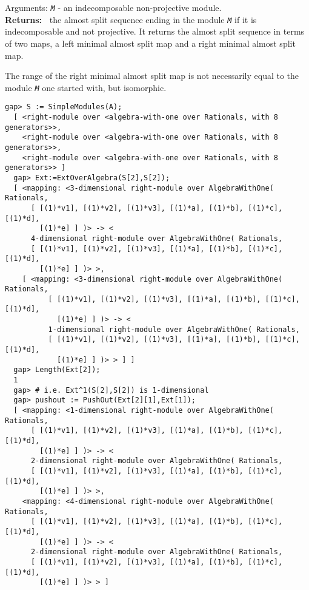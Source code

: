 \documentclass[a4paper,11pt]{report}
\begin{document}
{{{ Arguments: \mbox{\texttt{\slshape M}} - an indecomposable non-projective module.\\
 \textbf{\indent Returns:\ }
the almost split sequence ending in the module \mbox{\texttt{\slshape M}} if it is indecomposable and not projective. It returns the almost split
sequence in terms of two maps, a left minimal almost split map and a right
minimal almost split map. 



 The range of the right minimal almost split map is not necessarily equal to
the module \mbox{\texttt{\slshape M}} one started with, but isomorphic. }

 
\begin{Verbatim}[fontsize=\small,frame=single,label=Example]
  gap> S := SimpleModules(A);
  [ <right-module over <algebra-with-one over Rationals, with 8 generators>>, 
    <right-module over <algebra-with-one over Rationals, with 8 generators>>, 
    <right-module over <algebra-with-one over Rationals, with 8 generators>> ]
  gap> Ext:=ExtOverAlgebra(S[2],S[2]);
  [ <mapping: <3-dimensional right-module over AlgebraWithOne( Rationals, 
      [ [(1)*v1], [(1)*v2], [(1)*v3], [(1)*a], [(1)*b], [(1)*c], [(1)*d], 
        [(1)*e] ] )> -> <
      4-dimensional right-module over AlgebraWithOne( Rationals, 
      [ [(1)*v1], [(1)*v2], [(1)*v3], [(1)*a], [(1)*b], [(1)*c], [(1)*d], 
        [(1)*e] ] )> >, 
    [ <mapping: <3-dimensional right-module over AlgebraWithOne( Rationals, 
          [ [(1)*v1], [(1)*v2], [(1)*v3], [(1)*a], [(1)*b], [(1)*c], [(1)*d], 
            [(1)*e] ] )> -> <
          1-dimensional right-module over AlgebraWithOne( Rationals, 
          [ [(1)*v1], [(1)*v2], [(1)*v3], [(1)*a], [(1)*b], [(1)*c], [(1)*d], 
            [(1)*e] ] )> > ] ]
  gap> Length(Ext[2]);
  1
  gap> # i.e. Ext^1(S[2],S[2]) is 1-dimensional
  gap> pushout := PushOut(Ext[2][1],Ext[1]);   
  [ <mapping: <1-dimensional right-module over AlgebraWithOne( Rationals, 
      [ [(1)*v1], [(1)*v2], [(1)*v3], [(1)*a], [(1)*b], [(1)*c], [(1)*d], 
        [(1)*e] ] )> -> <
      2-dimensional right-module over AlgebraWithOne( Rationals, 
      [ [(1)*v1], [(1)*v2], [(1)*v3], [(1)*a], [(1)*b], [(1)*c], [(1)*d], 
        [(1)*e] ] )> >, 
    <mapping: <4-dimensional right-module over AlgebraWithOne( Rationals, 
      [ [(1)*v1], [(1)*v2], [(1)*v3], [(1)*a], [(1)*b], [(1)*c], [(1)*d], 
        [(1)*e] ] )> -> <
      2-dimensional right-module over AlgebraWithOne( Rationals, 
      [ [(1)*v1], [(1)*v2], [(1)*v3], [(1)*a], [(1)*b], [(1)*c], [(1)*d], 
        [(1)*e] ] )> > ]

\end{Verbatim}}}
\end{document}
